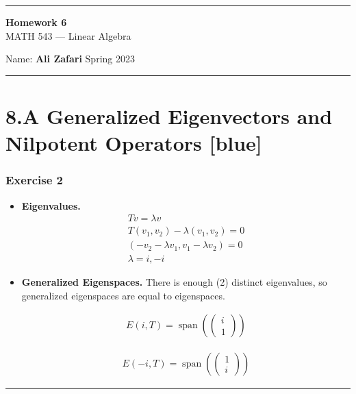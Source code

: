\documentclass[12pt, letterpaper]{scrartcl}
\DeclareMathOperator{\Span}{span}
\begin{document}
\begin{center}
    \hrule
    \vspace{0.4cm}
    { \textbf{{\large Homework 6}} \\ MATH 543 --- Linear Algebra}
\end{center}
{ Name: \textbf{Ali Zafari} \hspace{\fill} Spring 2023 } \newline\hrule

\section*{8.A Generalized Eigenvectors and Nilpotent Operators \xrfill[2pt]{3pt}[blue]}

\subsubsection*{Exercise 2}
\begin{itemize}
    \item \textbf{Eigenvalues.}
    \begin{align*}
        Tv=\lambda v\\
        T(v_1, v_2)-\lambda(v_1, v_2) = 0\\
        (-v_2 -\lambda v_1, v_1-\lambda v_2)=0\\
        \lambda = i, -i
    \end{align*}
    
    \item \textbf{Generalized Eigenspaces.}
    There is enough (2) distinct eigenvalues, so generalized eigenspaces are equal to eigenspaces.

    \begin{align*}
        E(i, T)=\Span(
        \left(
        \begin{array}{c}
          i\\
          1
        \end{array}
        \right)
        )
    \end{align*}

    \begin{align*}
        E(-i, T)=\Span(
        \left(
        \begin{array}{c}
          1\\
          i
        \end{array}
        \right)
        )
    \end{align*}
\end{itemize}
\vskip1mm\hrule
\end{document}
